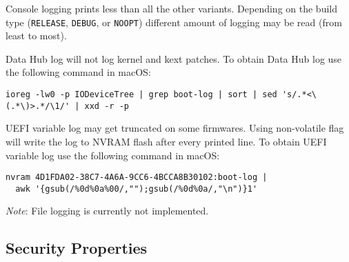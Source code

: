 \documentclass[]{article}
\begin{document}
\begin{enumerate}
  Console logging prints less than all the other variants.
  Depending on the build type (\texttt{RELEASE}, \texttt{DEBUG}, or
  \texttt{NOOPT}) different amount of logging may be read (from least to most).

  Data Hub log will not log kernel and kext patches. To obtain Data Hub log use
  the following command in macOS:
\begin{lstlisting}[label=dhublog, style=ocbash]
ioreg -lw0 -p IODeviceTree | grep boot-log | sort | sed 's/.*<\(.*\)>.*/\1/' | xxd -r -p
\end{lstlisting}

  UEFI variable log may get truncated on some firmwares.
  Using non-volatile flag will write the log to NVRAM flash after every
  printed line. To obtain UEFI variable log use the following command
  in macOS:
\begin{lstlisting}[label=nvramlog, style=ocbash]
nvram 4D1FDA02-38C7-4A6A-9CC6-4BCCA8B30102:boot-log |
  awk '{gsub(/%0d%0a%00/,"");gsub(/%0d%0a/,"\n")}1'
\end{lstlisting}

  \emph{Note}: File logging is currently not implemented.

\end{enumerate}

\subsection{Security Properties}\label{miscsecurityprops}
\end{document}
